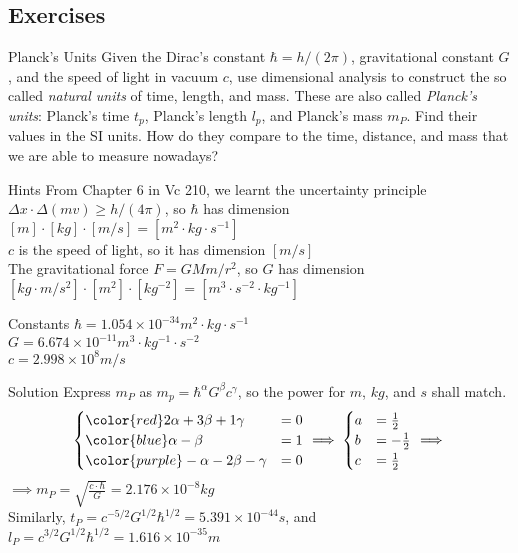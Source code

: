 \subsection{Exercises}
\begin{frame}
\begin{block}{Planck's Units}
Given the Dirac's constant $\hbar=h/(2\pi)$, gravitational constant $G$, and the speed of light in vacuum $c$, use dimensional analysis to construct the so called \emph{natural units} of time, length, and mass. These are also called \emph{Planck's units}: Planck's time $t_{p}$, Planck's length $l_{p}$, and Planck's mass $m_{P}$. Find their values in the SI units. How do they compare to the time, distance, and mass that we are able to measure nowadays?
\end{block}
\begin{block}{Hints}
From Chapter 6 in Vc 210, we learnt the uncertainty principle $\Delta x\cdot \Delta (mv)\geq h/(4\pi)$, so $\hbar$ has dimension $\unit{[m]\cdot [kg]\cdot [m/s]}=\unit{[m^{2}\cdot kg\cdot s^{-1}]}$\\$c$ is the speed of light, so it has dimension $[m/s]$\\The gravitational force $F=GMm/r^{2}$, so $G$ has dimension $\unit{[kg\cdot m/s^{2}]\cdot [m^{2}]\cdot [kg^{-2}]}=\unit{[m^{3}\cdot s^{-2}\cdot kg^{-1}]}$
\end{block}
\end{frame}
\begin{frame}
\begin{block}{Constants}
$\hbar=1.054\times 10^{-34}\unit{m^{2}\cdot kg\cdot s^{-1}}$\\$G=6.674\times 10^{-11}\unit{m^{3}\cdot kg^{-1}\cdot s^{-2}}$\\$c=2.998\times 10^{8}\unit{m/s}$\\
\end{block}
\begin{block}{Solution}
Express $m_{P}$ as $m_{p}=\hbar^{\alpha}G^{\beta}c^{\gamma}$, so the power for {\color{red}$\unit{m}$}, {\color{blue}$\unit{kg}$}, and {\color{purple}$\unit{s}$} shall match.
\[
\begin{cases}
{\color{red}2\alpha+3\beta+1\gamma}&=0\\
{\color{blue}\alpha-\beta}&=1\\
{\color{purple}-\alpha-2\beta-\gamma}&=0
\end{cases}\implies
\begin{cases}
a&=\frac{1}{2}\\
b&=-\frac{1}{2}\\
c&=\frac{1}{2}
\end{cases}\implies\]
$\implies m_{P}=\sqrt{\frac{c\cdot \hbar}{G}}=2.176\times 10^{-8}\unit{kg}$\\
Similarly, $t_{P}=c^{-5/2}G^{1/2}\hbar^{1/2}=5.391\times 10^{-44}\unit{s}$, and $l_{P}=c^{3/2}G^{1/2}\hbar^{1/2}=1.616\times 10^{-35}\unit{m}$
\end{block}
\end{frame}
